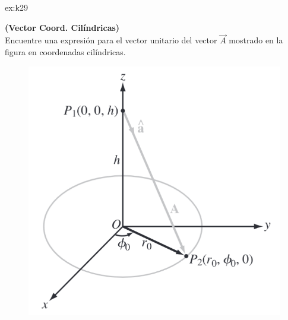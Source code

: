  \begin{multicols}{2}

 
    \begin{excercise}[][][$\vec{e}_A=\displaystyle{\frac{r_0\vec{e}_r-h\vec{k}}{\sqrt{r_0^2+h^2}}}$]{ex:k29}{
        \textbf{(Vector Coord. Cilíndricas)}\\
        Encuentre una expresión para el vector unitario del vector $\vec{A}$ mostrado en la figura en coordenadas cilíndricas.
        \begin{figure}[H]
            \centering
            \includegraphics[width=0.7\linewidth]{img/01_electric-field/1.png}
        \end{figure}
    }
    \end{excercise}


\end{multicols}

